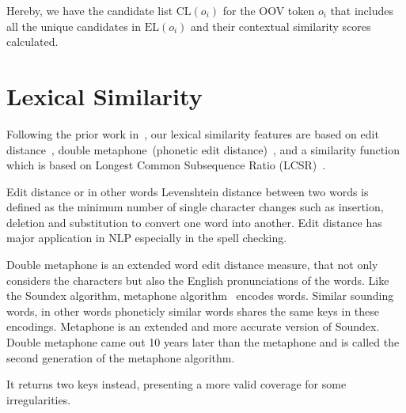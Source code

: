 \documentclass[a4paper,onesided,12pt]{report}
\begin{document}
Hereby, we have the candidate list $\text{CL}(o_{i})$ for the OOV token $o_i$ that includes all the unique candidates in $\text{EL}(o_{i})$ and their contextual similarity scores calculated.

\section{Lexical Similarity}
\label{sec:lexsim}

Following the prior work in~\cite{Han:2011:LNS:2002472.2002520,DBLP:conf/acl/HassanM13}, our lexical similarity features are based on edit distance~\cite{levenshtein1966bcc}, double metaphone~(phonetic edit distance)~\cite{Philips:2000:DMS:349124.349132}, and a similarity function~\cite{Contractor:2010:UCN:1944566.1944588} which is based on Longest Common Subsequence Ratio (LCSR)~\cite{melamed1999bitext}.

Edit distance or in other words Levenshtein distance between two words is defined as the minimum number of single character changes such as insertion, deletion and substitution to convert one word into another. Edit distance has major application in NLP especially in the spell checking.

Double metaphone is an extended word edit distance measure, that not only considers the characters but also the English pronunciations of the words. Like the Soundex algorithm, metaphone algorithm~\cite{philips1990hanging} encodes words. Similar sounding words, in other words phoneticly similar words shares the same keys in these encodings. Metaphone is an extended and more accurate version of Soundex. Double metaphone came out 10 years later than the metaphone and is called the second generation of the metaphone algorithm.

It returns two keys instead, presenting a more valid coverage for some irregularities. %
\end{document}
